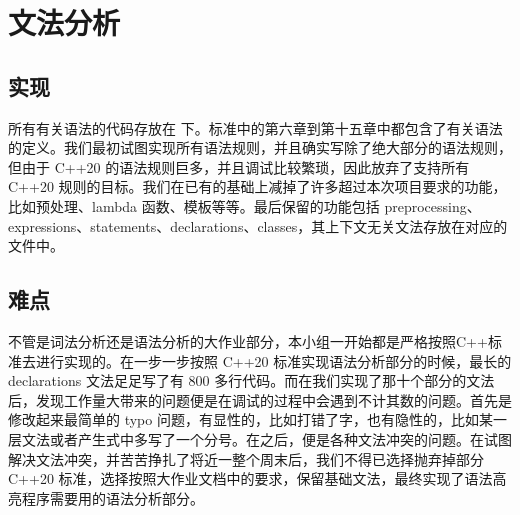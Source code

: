 \section{文法分析}

\subsection{实现}

所有有关语法的代码存放在  下。标准中的第六章到第十五章中都包含了有关语法的定义。我们最初试图实现所有语法规则，并且确实写除了绝大部分的语法规则，但由于 C++20 的语法规则巨多，并且调试比较繁琐，因此放弃了支持所有 C++20 规则的目标。我们在已有的基础上减掉了许多超过本次项目要求的功能，比如预处理、lambda 函数、模板等等。最后保留的功能包括 preprocessing、expressions、statements、declarations、classes，其上下文无关文法存放在对应的文件中。

\subsection{难点}

不管是词法分析还是语法分析的大作业部分，本小组一开始都是严格按照C++标准去进行实现的。在一步一步按照 C++20 标准实现语法分析部分的时候，最长的 declarations 文法足足写了有 800 多行代码。而在我们实现了那十个部分的文法后，发现工作量大带来的问题便是在调试的过程中会遇到不计其数的问题。首先是修改起来最简单的 typo 问题，有显性的，比如打错了字，也有隐性的，比如某一层文法或者产生式中多写了一个分号。在之后，便是各种文法冲突的问题。在试图解决文法冲突，并苦苦挣扎了将近一整个周末后，我们不得已选择抛弃掉部分 C++20 标准，选择按照大作业文档中的要求，保留基础文法，最终实现了语法高亮程序需要用的语法分析部分。